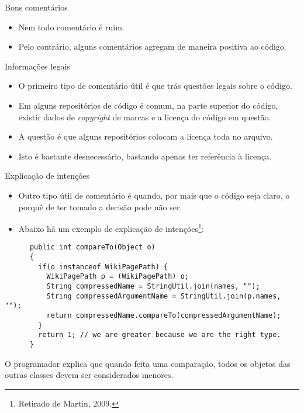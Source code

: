 \documentclass[11pt]{beamer}
\begin{document}
  \begin{frame}{Bons comentários}
    \begin{itemize}
      \item Nem todo comentário é ruim.
      \item Pelo contrário, alguns comentários agregam de maneira positiva ao código.
    \end{itemize}
  \end{frame}

  \begin{frame}{Informações legais}
    \begin{itemize}
      \item O primeiro tipo de comentário útil é que trás questões legais sobre o código.
      \item Em alguns repositórios de código é comum, na parte superior do código, existir dados de \textit{copyright} de marcas e a licença do código em questão.
      \item A questão é que alguns repositórios colocam a licença toda no arquivo.
      \item Isto é bastante desnecessário, bastando apenas ter referência à licença.
    \end{itemize}
  \end{frame}

  \begin{frame}[fragile]{Explicação de intenções}
    \begin{itemize}
      \item Outro tipo útil de comentário é quando, por mais que o código seja claro, o porquê de ter tomado a decisão pode não ser.
      \item Abaixo há um exemplo de explicação de intenções\footnote{Retirado de Martin, 2009.}:
    \end{itemize}
    \begin{lstlisting}
      public int compareTo(Object o)
      {
        if(o instanceof WikiPagePath) {
          WikiPagePath p = (WikiPagePath) o;
          String compressedName = StringUtil.join(names, "");
          String compressedArgumentName = StringUtil.join(p.names, "");
          return compressedName.compareTo(compressedArgumentName);
        }
        return 1; // we are greater because we are the right type.
      }
    \end{lstlisting}
    O programador explica que quando feita uma comparação, todos os objetos das outras classes devem ser considerados menores.
  \end{frame}
\end{document}
